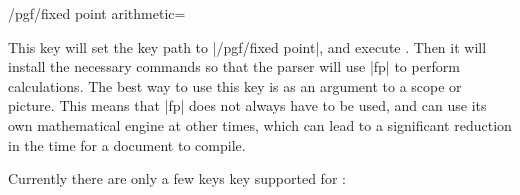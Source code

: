 \begin{key}{/pgf/fixed point arithmetic=}

  This key will set the key path to |/pgf/fixed point|, and
  execute . Then it will install the necessary
  commands so that the \pgfname{} parser will use |fp| to perform
  calculations.
  The best way to use this key is as an argument to a scope or
  picture. This means that |fp| does not always have to be used,
  and \pgfname{} can use its own mathematical engine at other times,
  which can lead to a significant reduction in the time for a document
  to compile.

\end{key}

  Currently there are only a few keys key supported for :

